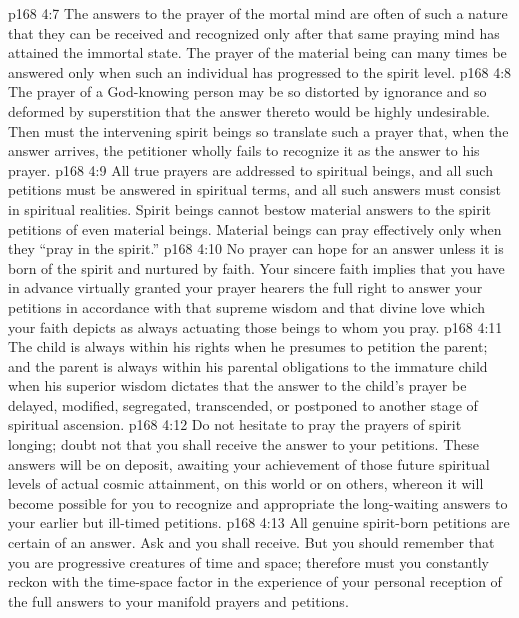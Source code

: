 \vs p168 4:7 \pc {}\bibnobreakspace The answers to the prayer of the mortal mind are often of such a nature that they can be received and recognized only after that same praying mind has attained the immortal state. The prayer of the material being can many times be answered only when such an individual has progressed to the spirit level.
\vs p168 4:8 \pc {}\bibnobreakspace The prayer of a God\hyp{}knowing person may be so distorted by ignorance and so deformed by superstition that the answer thereto would be highly undesirable. Then must the intervening spirit beings so translate such a prayer that, when the answer arrives, the petitioner wholly fails to recognize it as the answer to his prayer.
\vs p168 4:9 \pc {}\bibnobreakspace All true prayers are addressed to spiritual beings, and all such petitions must be answered in spiritual terms, and all such answers must consist in spiritual realities. Spirit beings cannot bestow material answers to the spirit petitions of even material beings. Material beings can pray effectively only when they “pray in the spirit.”
\vs p168 4:10 \pc {}\bibnobreakspace No prayer can hope for an answer unless it is born of the spirit and nurtured by faith. Your sincere faith implies that you have in advance virtually granted your prayer hearers the full right to answer your petitions in accordance with that supreme wisdom and that divine love which your faith depicts as always actuating those beings to whom you pray.
\vs p168 4:11 \pc {}\bibnobreakspace The child is always within his rights when he presumes to petition the parent; and the parent is always within his parental obligations to the immature child when his superior wisdom dictates that the answer to the child’s prayer be delayed, modified, segregated, transcended, or postponed to another stage of spiritual ascension.
\vs p168 4:12 \pc {}\bibnobreakspace Do not hesitate to pray the prayers of spirit longing; doubt not that you shall receive the answer to your petitions. These answers will be on deposit, awaiting your achievement of those future spiritual levels of actual cosmic attainment, on this world or on others, whereon it will become possible for you to recognize and appropriate the long\hyp{}waiting answers to your earlier but ill\hyp{}timed petitions.
\vs p168 4:13 \pc {}\bibnobreakspace All genuine spirit\hyp{}born petitions are certain of an answer. Ask and you shall receive. But you should remember that you are progressive creatures of time and space; therefore must you constantly reckon with the time\hyp{}space factor in the experience of your personal reception of the full answers to your manifold prayers and petitions.
